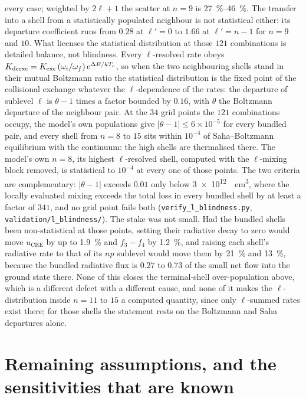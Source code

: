every case; weighted by $2\ell+1$ the scatter at $n = 9$ is
\SIrange{27}{46}{\percent}. The transfer into a shell from a statistically
populated neighbour is not statistical either: its departure coefficient runs
from $0.28$ at $\ell' = 0$ to $1.66$ at $\ell' = n-1$ for $n = 9$ and $10$.
What licenses the statistical distribution at those $121$ combinations is
detailed balance, not blindness. Every $\ell$-resolved rate obeys
$K_{\mathrm{deexc}} = K_{\mathrm{exc}}\,(\omega_i/\omega_f)\,
\mathrm{e}^{\Delta E/kT_e}$, so when the two neighbouring shells stand in their
mutual Boltzmann ratio the statistical distribution is the fixed point of the
collisional exchange whatever the $\ell$-dependence of the rates: the
departure of sublevel $\ell$ is $\theta - 1$ times a factor bounded by
$0.16$, with $\theta$ the Boltzmann departure of the neighbour pair. At the
$34$ grid points the $121$ combinations occupy, the model's own populations
give $|\theta - 1| \le 6\times10^{-5}$ for every bundled pair, and every
shell from $n = 8$ to $15$ sits within $10^{-4}$ of Saha--Boltzmann
equilibrium with the continuum: the high shells are thermalised there. The
model's own $n = 8$, its highest $\ell$-resolved shell, computed with the
$\ell$-mixing block removed, is statistical to $10^{-4}$ at every one of those
points. The two criteria are complementary: $|\theta - 1|$ exceeds $0.01$ only
below \SI{3e12}{\per\cubic\centi\metre}, where the locally evaluated mixing
exceeds the total loss in every bundled shell by at least a factor of $341$,
and no grid point fails both (\texttt{verify\_l\_blindness.py},
\texttt{validation/l\_blindness/}). The stake was not small. Had the bundled
shells been non-statistical at those points, setting their radiative decay to
zero would move $u_{\mathrm{CRE}}$ by up to \SI{1.9}{\percent} and $f_3 - f_4$
by \SI{1.2}{\percent}, and raising each shell's radiative rate to that of its
$np$ sublevel would move them by \SI{21}{\percent} and \SI{13}{\percent},
because the bundled radiative flux is $0.27$ to $0.73$ of the small net flow
into the ground state there. None of this closes the terminal-shell
over-population above, which is a different defect with a different cause,
and none of it makes the $\ell$-distribution inside $n = 11$ to $15$ a
computed quantity, since only $\ell$-summed rates exist there; for those
shells the statement rests on the Boltzmann and Saha departures alone.

\section{Remaining assumptions, and the sensitivities that are known}
\label{sec:other_assumptions}

